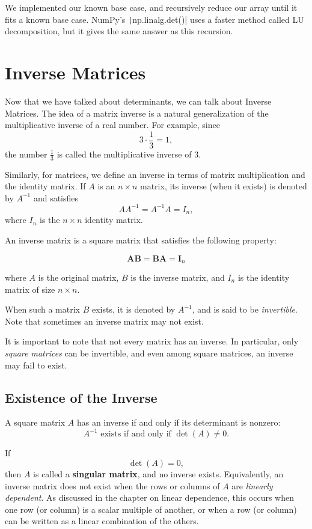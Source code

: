 We implemented our known base case, and recursively reduce our array until it fits a known base case. NumPy's \texttt|np.linalg.det()| uses a faster method called LU decomposition, but it gives the same answer as this recursion.
\section{Inverse Matrices}
Now that we have talked about determinants, we can talk about Inverse Matrices. 
The idea of a matrix inverse is a natural generalization of the multiplicative inverse of a real number. 
For example, since
\[
3 \cdot \frac{1}{3} = 1,
\]
the number \( \frac{1}{3} \) is called the multiplicative inverse of \( 3 \).

Similarly, for matrices, we define an inverse in terms of matrix multiplication and the identity matrix. 
If \( A \) is an \( n \times n \) matrix, its inverse (when it exists) is denoted by \( A^{-1} \) and satisfies
\[
AA^{-1} = A^{-1}A = I_n,
\]
where \( I_n \) is the \( n \times n \) identity matrix.
\begin{mdframed}[frametitle = {Inverse Matrix}, style = important]
An inverse matrix is a square matrix that satisfies the following property:

$$\mathbf {AB} =\mathbf {BA} =\mathbf {I} _{n}$$

where $A$ is the original matrix, $B$ is the inverse matrix, and $I_n$ is the identity matrix of size $n \times n$. 

When such a matrix \( B \) exists, it is denoted by \( A^{-1} \), and is said to be \emph{invertible}. Note that sometimes an inverse matrix may not exist.
\end{mdframed}

It is important to note that not every matrix has an inverse. 
In particular, only \emph{square matrices} can be invertible, and even among square matrices, an inverse may fail to exist.
\subsection*{Existence of the Inverse}

A square matrix \( A \) has an inverse if and only if its determinant is nonzero:
\[
A^{-1} \text{ exists if and only if } \det(A) \neq 0.
\]

If
\[
\det(A) = 0,
\]
then \( A \) is called a \textbf{singular matrix}, and no inverse exists.
Equivalently, an inverse matrix does not exist when the rows or columns of \( A \) are \emph{linearly dependent}. 
As discussed in the chapter on linear dependence, this occurs when one row (or column) is a scalar multiple of another, or when a row (or column) can be written as a linear combination of the others.

